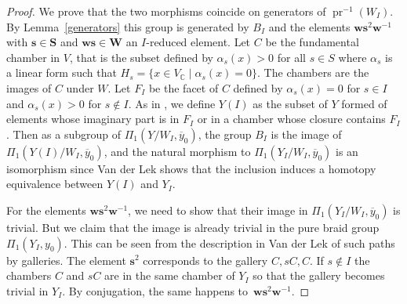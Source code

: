 \documentclass{amsart}
\numberwithin{equation}{section}
\newcommand\inv{^{-1}}
\newcommand\bs{{\mathbf s}}
\newcommand\bw{{\mathbf w}}
\newcommand\bS{{\mathbf S}}
\newcommand\bW{{\mathbf W}}
\newcommand\BC{{\mathbb C}}
\DeclareMathOperator\pr{pr}
\begin{document}
\begin{proof}
We prove that the two morphisms coincide on generators of $\pr\inv(W_I)$. By
Lemma~\ref{generators} this group is
generated by $B_I$ and the elements $\bw\bs^2\bw\inv$ with $\bs\in\bS$ and 
$\bw\bs\in\bW$ an $I$-reduced element.
Let $C$ be the fundamental chamber in $V$, that is the subset defined
by $\alpha_s(x)>0$ for all $s\in S$ where $\alpha_s$ is a linear form
such that  $H_s=\{x\in V_\BC\mid \alpha_s(x)=0\}$. The chambers are the images
of $C$ under $W$. Let $F_I$ be the facet of $C$ defined by $\alpha_s(x)=0$
for $s\in I$ and $\alpha_s(x)>0$ for $s\not\in I$. As in \cite[II, Definition 4.8]{VanderLek}, we
define $Y(I)$ as the subset of $Y$ formed of elements whose imaginary part is
in $F_I$ or in a chamber whose closure contains $F_I$.
Then as a subgroup of $\Pi_1(Y/W_I,\overline y_0)$, the group $B_I$
is the image of $\Pi_1(Y(I)/W_I,\overline y_0)$, and the natural
morphism to $\Pi_1(Y_I/W_I,\overline y_0)$ is an isomorphism since Van der Lek
\cite[II, Proposition 4.9]{VanderLek} shows that the inclusion induces a homotopy equivalence between $Y(I)$ and
$Y_I$.

For the elements $\bw\bs^2\bw\inv$, we need to show that their image
in $\Pi_1(Y_I/W_I,\overline y_0)$ is
trivial. But we claim that the image is
already trivial in the pure braid group $\Pi_1(Y_I,y_0)$.
This can be seen from the description in Van der Lek 
\cite[I, Theorem~2.21 and II, Discussion 3.10]{VanderLek} of such paths by
galleries. 
The element $\bs^2$ corresponds to the gallery $C,sC,C$. If $s\not\in I$ the
chambers $C$ and $sC$ are in the same chamber of $Y_I$ so that the gallery
becomes trivial in $Y_I$. By conjugation, the same happens to~$\bw\bs^2\bw\inv$.
\end{proof}


\printindex
\end{document}
